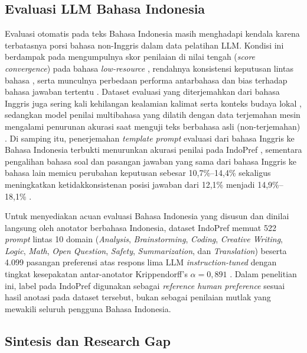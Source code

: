 \subsection{Evaluasi LLM Bahasa Indonesia}

Evaluasi otomatis pada teks Bahasa Indonesia masih menghadapi kendala karena terbatasnya porsi bahasa non-Inggris dalam data pelatihan LLM. Kondisi ini berdampak pada mengumpulnya skor penilaian di nilai tengah (\textit{score convergence}) pada bahasa \textit{low-resource} \cite{sonMMEvalMultilingualMetaEvaluation2025}, rendahnya konsistensi keputusan lintas bahasa \cite{fuHowReliableMultilingual2025}, serta munculnya perbedaan performa antarbahasa dan bias terhadap bahasa jawaban tertentu \cite{zhouFairnessFluencyInvestigation2026}. Dataset evaluasi yang diterjemahkan dari bahasa Inggris juga sering kali kehilangan kealamian kalimat serta konteks budaya lokal \cite{wiyonoIndoPrefMultiDomainPairwise2025}, sedangkan model penilai multibahasa yang dilatih dengan data terjemahan mesin mengalami penurunan akurasi saat menguji teks berbahasa asli (non-terjemahan) \cite{pombalMPrometheusSuiteOpen2025}. Di samping itu, penerjemahan \textit{template prompt} evaluasi dari bahasa Inggris ke Bahasa Indonesia terbukti menurunkan akurasi penilai pada IndoPref \cite{wiyonoIndoPrefMultiDomainPairwise2025}, sementara pengalihan bahasa soal dan pasangan jawaban yang sama dari bahasa Inggris ke bahasa lain memicu perubahan keputusan sebesar 10,7\%--14,4\% sekaligus meningkatkan ketidakkonsistenan posisi jawaban dari 12,1\% menjadi 14,9\%--18,1\% \cite{yinDoesJudgePrefer2026}.

Untuk menyediakan acuan evaluasi Bahasa Indonesia yang disusun dan dinilai langsung oleh anotator berbahasa Indonesia, dataset IndoPref memuat 522 \textit{prompt} lintas 10 domain (\textit{Analysis}, \textit{Brainstorming}, \textit{Coding}, \textit{Creative Writing}, \textit{Logic}, \textit{Math}, \textit{Open Question}, \textit{Safety}, \textit{Summarization}, dan \textit{Translation}) beserta 4.099 pasangan preferensi atas respons lima LLM \textit{instruction-tuned} dengan tingkat kesepakatan antar-anotator Krippendorff's $\alpha = 0,891$ \cite{wiyonoIndoPrefMultiDomainPairwise2025}. Dalam penelitian ini, label pada IndoPref digunakan sebagai \textit{reference human preference} sesuai hasil anotasi pada dataset tersebut, bukan sebagai penilaian mutlak yang mewakili seluruh pengguna Bahasa Indonesia.

\subsection{Sintesis dan Research Gap}


